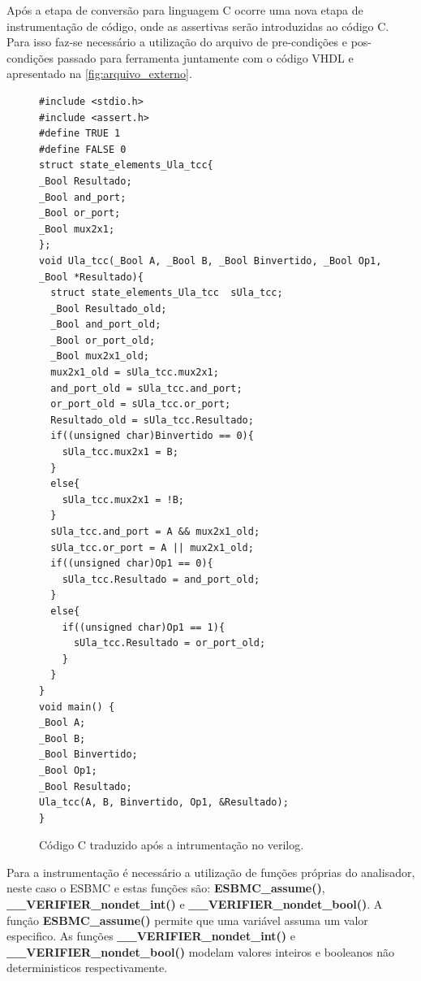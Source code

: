 \par
Após a etapa de conversão para linguagem C ocorre uma nova etapa de instrumentação de código, onde as assertivas serão introduzidas ao código C. Para isso faz-se necessário a utilização do arquivo de pre-condições e pos-condições passado para ferramenta juntamente com o código VHDL e apresentado na \autoref{fig:arquivo_externo}.

\begin{figure}[H]
\caption{\label{fig:codigo_C} Código C traduzido após a intrumentação no verilog.}
	\begin{center}
    \begin{minipage}{0.7\textwidth}
    \begin{lstlisting}
#include <stdio.h>
#include <assert.h>
#define TRUE 1
#define FALSE 0
struct state_elements_Ula_tcc{
_Bool Resultado;
_Bool and_port;
_Bool or_port;
_Bool mux2x1;
};
void Ula_tcc(_Bool A, _Bool B, _Bool Binvertido, _Bool Op1, _Bool *Resultado){
  struct state_elements_Ula_tcc  sUla_tcc;
  _Bool Resultado_old;
  _Bool and_port_old;
  _Bool or_port_old;
  _Bool mux2x1_old;
  mux2x1_old = sUla_tcc.mux2x1;
  and_port_old = sUla_tcc.and_port;
  or_port_old = sUla_tcc.or_port;
  Resultado_old = sUla_tcc.Resultado;
  if((unsigned char)Binvertido == 0){
    sUla_tcc.mux2x1 = B;
  }
  else{
    sUla_tcc.mux2x1 = !B;
  }
  sUla_tcc.and_port = A && mux2x1_old;
  sUla_tcc.or_port = A || mux2x1_old;
  if((unsigned char)Op1 == 0){
    sUla_tcc.Resultado = and_port_old;
  }
  else{
    if((unsigned char)Op1 == 1){
      sUla_tcc.Resultado = or_port_old;
    }
  }
}
void main() {
_Bool A;
_Bool B;
_Bool Binvertido;
_Bool Op1;
_Bool Resultado;
Ula_tcc(A, B, Binvertido, Op1, &Resultado);
}
    \end{lstlisting}
    \end{minipage}
	\end{center}
\end{figure}

\par
Para a instrumentação é necessário a utilização de funções próprias do analisador, neste caso o ESBMC \cite{esbmc} e estas funções são: \textbf{ESBMC\_assume()}, \textbf{\_\_VERIFIER\_nondet\_int()} e \textbf{\_\_VERIFIER\_nondet\_bool()}. A função \textbf{ESBMC\_assume()} permite que uma variável assuma um valor especifico. As funções \textbf{\_\_VERIFIER\_nondet\_int()} e \textbf{\_\_VERIFIER\_nondet\_bool()} modelam valores inteiros e booleanos não deterministicos respectivamente.

